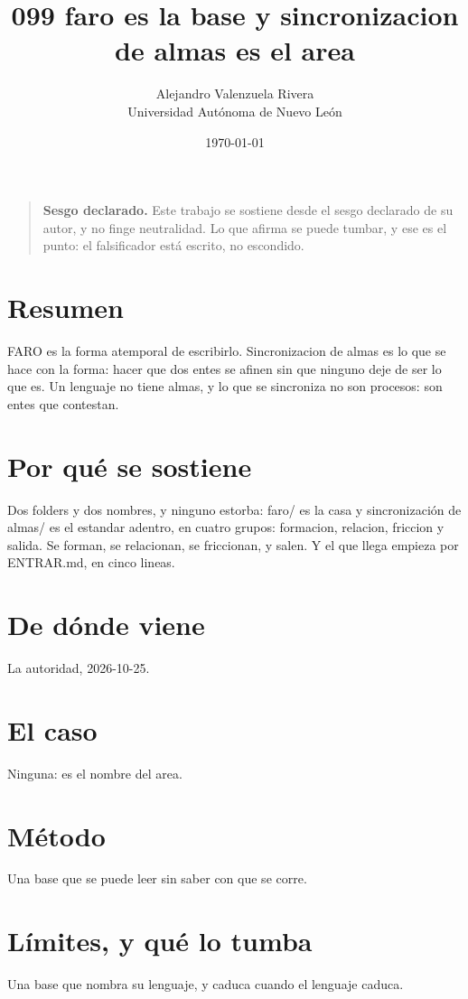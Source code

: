 \documentclass[11pt,a4paper]{article}
\title{099 faro es la base y sincronizacion de almas es el area}
\author{Alejandro Valenzuela Rivera\\\small Universidad Autónoma de Nuevo León}
\date{\today}
\begin{document}
\maketitle

\begin{quote}
\textbf{Sesgo declarado.} Este trabajo se sostiene desde el sesgo declarado de su autor, y no finge neutralidad. Lo que afirma se puede tumbar, y ese es el punto: el falsificador está escrito, no escondido.
\end{quote}

\section*{Resumen}
FARO es la forma atemporal de escribirlo. Sincronizacion de almas es lo que se hace con la forma: hacer que dos entes se afinen sin que ninguno deje de ser lo que es. Un lenguaje no tiene almas, y lo que se sincroniza no son procesos: son entes que contestan.

\section{Por qué se sostiene}
Dos folders y dos nombres, y ninguno estorba: faro/ es la casa y sincronización de almas/ es el estandar adentro, en cuatro grupos: formacion, relacion, friccion y salida. Se forman, se relacionan, se friccionan, y salen. Y el que llega empieza por ENTRAR.md, en cinco lineas.

\section{De dónde viene}
La autoridad, 2026-10-25.

\section{El caso}
Ninguna: es el nombre del area.

\section{Método}
Una base que se puede leer sin saber con que se corre.

\section{Límites, y qué lo tumba}
Una base que nombra su lenguaje, y caduca cuando el lenguaje caduca.
\end{document}
